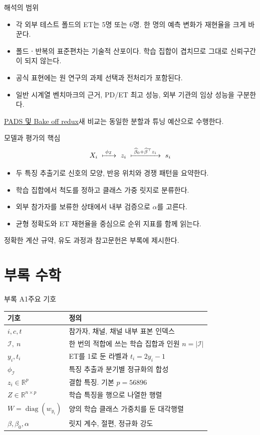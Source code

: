 \documentclass[aspectratio=169,11pt]{beamer}
\newcommand{\R}{\mathbb R}
\newcommand{\src}[1]{\par\vfill{\scriptsize\color{gray}#1}\par}
\DeclareMathOperator{\diag}{diag}
\begin{document}
\begin{frame}[t]{해석의 범위}
\begin{itemize}
 \item 각 외부 테스트 폴드의 ET는 5명 또는 6명.
       한 명의 예측 변화가 재현율을 크게 바꾼다.
 \item 폴드ㆍ반복의 표준편차는 기술적 산포이다.
       학습 집합이 겹치므로 그대로 신뢰구간이 되지 않는다.
 \item 공식 표현에는 원 연구의 과제 선택과 전처리가 포함된다.
 \item 일반 시계열 벤치마크의 근거, PD/ET 최고 성능,
       외부 기관의 임상 성능을 구분한다.
\end{itemize}
\src{\hyperlink{ref-papers}{PADS 및 Bake off redux}\quad 새 비교는 동일한 분할과 튜닝 예산으로 수행한다.}
\end{frame}

\begin{frame}[t]{모델과 평가의 핵심}
\[
 X_i\ \xmapsto{\;\phi_{\mathcal I}\;}\ 
 z_i\ \xmapsto{\;\widehat\beta_0+\widehat\beta^\top z_i\;}\ s_i
\]
\begin{itemize}
 \item 두 특징 추출기로 신호의 모양, 반응 위치와 경쟁 패턴을 요약한다.
 \item 학습 집합에서 척도를 정하고 클래스 가중 릿지로 분류한다.
 \item 외부 참가자를 보류한 상태에서 내부 검증으로 \(\alpha\)를 고른다.
 \item 균형 정확도와 ET 재현율을 중심으로 순위 지표를 함께 읽는다.
\end{itemize}
\src{정확한 계산 규약, 유도 과정과 참고문헌은 부록에 제시한다.}
\end{frame}

\appendix
\section{부록 수학}

\begin{frame}[t]{부록 A1\quad 주요 기호}
\small
\begin{tabularx}{\linewidth}{@{}lX@{}}
\toprule 기호 & 정의\\ \midrule
\(i,c,t\) & 참가자, 채널, 채널 내부 표본 인덱스\\
\(\mathcal I,\ n\) & 한 번의 적합에 쓰는 학습 집합과 인원 \(n=|\mathcal I|\)\\
\(y_i,t_i\) & ET를 1로 둔 라벨과 \(t_i=2y_i-1\)\\
\(\phi_{\mathcal I}\) & 특징 추출과 분기별 정규화의 합성\\
\(z_i\in\R^p\) & 결합 특징. 기본 \(p=56896\)\\
\(Z\in\R^{n\times p}\) & 학습 특징을 행으로 나열한 행렬\\
\(W=\diag(w_{y_i})\) & 양의 학습 클래스 가중치를 둔 대각행렬\\
\(\beta,\beta_0,\alpha\) & 릿지 계수, 절편, 정규화 강도\\ \bottomrule
\end{tabularx}
\end{frame}
\end{document}
